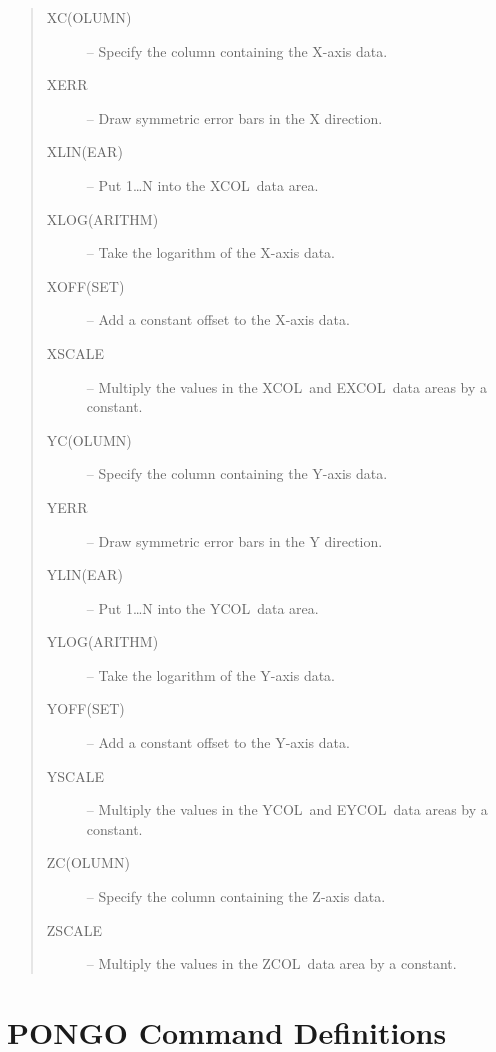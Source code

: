 \documentclass[twoside,11pt]{article}
\newcommand{\htmlref}[2]{#1}
\renewcommand{\_}{\texttt{\symbol{95}}}
\newcommand{\xcol}{{\sf XCOL}}
\newcommand{\excol}{{\sf EXCOL}}
\newcommand{\ycol}{{\sf YCOL}}
\newcommand{\eycol}{{\sf EYCOL}}
\newcommand{\zcol}{{\sf ZCOL}}
\newcommand{\iref} [1]{\htmlref{#1}{#1}}
\newcommand{\iiref}[2]{\htmlref{#1}{#2}}
\begin{document}
\begin {quote}
\begin {description}
\item [\iiref{XC(OLUMN)}{XCOLUMN}] -- Specify the column containing the
                                      X-axis data.
\item [\iref{XERR}] -- Draw symmetric error bars in the X direction.
\item [\iiref{XLIN(EAR)}{XLINEAR}] -- Put 1\ldots N into the \xcol\ data area.
\item [\iiref{XLOG(ARITHM)}{XLOGARITHM}] -- Take the logarithm of the
                                            X-axis data.
\item [\iiref{XOFF(SET)}{XOFFSET}] -- Add a constant offset to the
                                      X-axis data.
\item [\iref{XSCALE}] -- Multiply the values in the \xcol\ and \excol\ data areas
                         by a constant.
\item [\iiref{YC(OLUMN)}{YCOLUMN}] -- Specify the column containing the
                                      Y-axis data.
\item [\iref{YERR}] -- Draw symmetric error bars in the Y direction.
\item [\iiref{YLIN(EAR)}{YLINEAR}] -- Put 1\ldots N into the \ycol\ data
                                      area.
\item [\iiref{YLOG(ARITHM)}{YLOGARITHM}] -- Take the logarithm of the
                                            Y-axis data.
\item [\iiref{YOFF(SET)}{YOFFSET}] -- Add a constant offset to the
                                      Y-axis data.
\item [\iref{YSCALE}] -- Multiply the values in the \ycol\ and \eycol\ data areas
                         by a constant.
\item [\iiref{ZC(OLUMN)}{ZCOLUMN}] -- Specify the column containing the
                                      Z-axis data.
\item [\iref{ZSCALE}] -- Multiply the values in the \zcol\ data area by a
                         constant.
\end {description}
\end {quote}
\normalsize

\newpage
\section{PONGO Command Definitions} \label{defn_sect}
\end{document}
